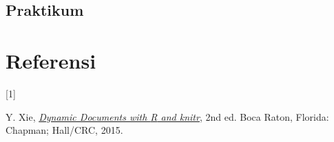 \documentclass[
  indonesian,
  letterpaper,
]{book}
\newlength{\cslhangindent}
\newlength{\csllabelwidth}
\newenvironment{CSLReferences}[2] %
 {\begin{list}{}{%
  \setlength{\itemindent}{0pt}
  \setlength{\leftmargin}{0pt}
  \setlength{\parsep}{0pt}
  \ifodd #1
   \setlength{\leftmargin}{\cslhangindent}
   \setlength{\itemindent}{-1\cslhangindent}
  \fi
  \setlength{\itemsep}{#2\baselineskip}}}
 {\end{list}}
\newcommand{\CSLLeftMargin}[1]{\parbox[t]{\csllabelwidth}{\strut#1\strut}}
\newcommand{\CSLRightInline}[1]{\parbox[t]{\linewidth - \csllabelwidth}{\strut#1\strut}}
\begin{document}
\section{Praktikum}\label{praktikum}


\chapter*{Referensi}\label{referensi}


\protect{}\label{refs}
\begin{CSLReferences}{0}{0}
\CSLLeftMargin{{[}1{]} }%
\CSLRightInline{Y. Xie, \emph{\href{http://yihui.name/knitr/}{Dynamic
Documents with {R} and knitr}}, 2nd ed. Boca Raton, Florida: Chapman;
Hall/CRC, 2015.}

\end{CSLReferences}


\backmatter
\end{document}
